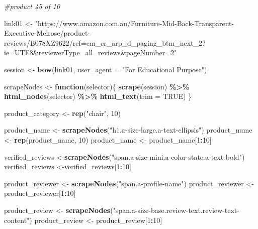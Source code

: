 \documentclass[
]{article}
\newenvironment{Shaded}{\begin{snugshade}}{\end{snugshade}}
\newcommand{\AttributeTok}[1]{\textcolor[rgb]{0.13,0.29,0.53}{#1}}
\newcommand{\CommentTok}[1]{\textcolor[rgb]{0.56,0.35,0.01}{\textit{#1}}}
\newcommand{\ConstantTok}[1]{\textcolor[rgb]{0.56,0.35,0.01}{#1}}
\newcommand{\ControlFlowTok}[1]{\textcolor[rgb]{0.13,0.29,0.53}{\textbf{#1}}}
\newcommand{\DecValTok}[1]{\textcolor[rgb]{0.00,0.00,0.81}{#1}}
\newcommand{\FunctionTok}[1]{\textcolor[rgb]{0.13,0.29,0.53}{\textbf{#1}}}
\newcommand{\NormalTok}[1]{#1}
\newcommand{\OtherTok}[1]{\textcolor[rgb]{0.56,0.35,0.01}{#1}}
\newcommand{\SpecialCharTok}[1]{\textcolor[rgb]{0.81,0.36,0.00}{\textbf{#1}}}
\newcommand{\StringTok}[1]{\textcolor[rgb]{0.31,0.60,0.02}{#1}}
\begin{document}
\begin{Shaded}
\begin{Highlighting}[]
\CommentTok{\#product 45 of 10}

\NormalTok{link01 }\OtherTok{\textless{}{-}} \StringTok{"https://www.amazon.com.au/Furniture{-}Mid{-}Back{-}Transparent{-}Executive{-}Melrose/product{-}reviews/B078XZ9622/ref=cm\_cr\_arp\_d\_paging\_btm\_next\_2?ie=UTF8\&reviewerType=all\_reviews\&pageNumber=2"}


\NormalTok{  session }\OtherTok{\textless{}{-}} \FunctionTok{bow}\NormalTok{(link01,}
               \AttributeTok{user\_agent =} \StringTok{"For Educational Purpose"}\NormalTok{)}

\NormalTok{  scrapeNodes }\OtherTok{\textless{}{-}} \ControlFlowTok{function}\NormalTok{(selector)\{}
    \FunctionTok{scrape}\NormalTok{(session) }\SpecialCharTok{\%\textgreater{}\%}
      \FunctionTok{html\_nodes}\NormalTok{(selector) }\SpecialCharTok{\%\textgreater{}\%}
      \FunctionTok{html\_text}\NormalTok{(}\AttributeTok{trim =} \ConstantTok{TRUE}\NormalTok{)}
\NormalTok{  \}}

\NormalTok{  product\_category }\OtherTok{\textless{}{-}} \FunctionTok{rep}\NormalTok{(}\StringTok{"chair"}\NormalTok{, }\DecValTok{10}\NormalTok{)}

\NormalTok{  product\_name }\OtherTok{\textless{}{-}} \FunctionTok{scrapeNodes}\NormalTok{(}\StringTok{"h1.a{-}size{-}large.a{-}text{-}ellipsis"}\NormalTok{)}
\NormalTok{  product\_name }\OtherTok{\textless{}{-}} \FunctionTok{rep}\NormalTok{(product\_name, }\DecValTok{10}\NormalTok{)}
\NormalTok{  product\_name }\OtherTok{\textless{}{-}}\NormalTok{ product\_name[}\DecValTok{1}\SpecialCharTok{:}\DecValTok{10}\NormalTok{]}
  
\NormalTok{  verified\_reviews }\OtherTok{\textless{}{-}}\FunctionTok{scrapeNodes}\NormalTok{(}\StringTok{"span.a{-}size{-}mini.a{-}color{-}state.a{-}text{-}bold"}\NormalTok{)}
\NormalTok{  verified\_reviews }\OtherTok{\textless{}{-}}\NormalTok{verified\_reviews[}\DecValTok{1}\SpecialCharTok{:}\DecValTok{10}\NormalTok{]}
  
\NormalTok{  product\_reviewer }\OtherTok{\textless{}{-}} \FunctionTok{scrapeNodes}\NormalTok{(}\StringTok{"span.a{-}profile{-}name"}\NormalTok{)}
\NormalTok{  product\_reviewer }\OtherTok{\textless{}{-}}\NormalTok{ product\_reviewer[}\DecValTok{1}\SpecialCharTok{:}\DecValTok{10}\NormalTok{]}
  
\NormalTok{  product\_review }\OtherTok{\textless{}{-}} \FunctionTok{scrapeNodes}\NormalTok{(}\StringTok{"span.a{-}size{-}base.review{-}text.review{-}text{-}content"}\NormalTok{)}
\NormalTok{  product\_review }\OtherTok{\textless{}{-}}\NormalTok{ product\_review[}\DecValTok{1}\SpecialCharTok{:}\DecValTok{10}\NormalTok{]}
  

\end{Highlighting}
\end{Shaded}
\end{document}
